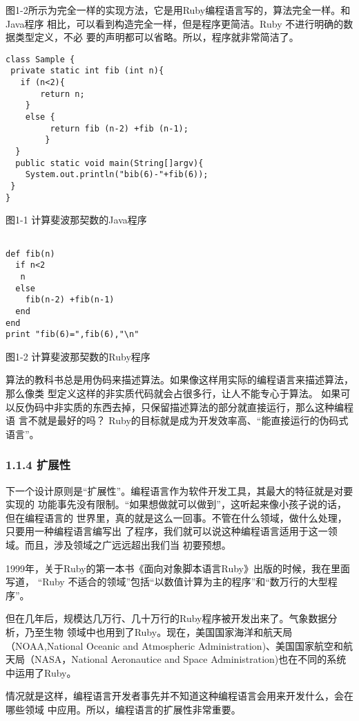 \documentclass[11pt]{ctexart}
\begin{document}
图1-2所示为完全一样的实现方法，它是用Ruby编程语言写的，算法完全一样。和Java程序
相比，可以看到构造完全一样，但是程序更简洁。Ruby 不进行明确的数据类型定义，不必
要的声明都可以省略。所以，程序就非常简洁了。
\lstset{language=org,label= ,caption= ,captionpos=b,numbers=none}
\begin{lstlisting}
class Sample {
 private static int fib (int n){
   if (n<2){
       return n;
    }
    else {
         return fib (n-2) +fib (n-1);
        }
  }
  public static void main(String[]argv){
    System.out.println("bib(6)-"+fib(6));
 }
}
\end{lstlisting}
图1-1 计算斐波那契数的Java程序
\lstset{language=org,label= ,caption= ,captionpos=b,numbers=none}
\begin{lstlisting}

def fib(n)
  if n<2
   n
  else
    fib(n-2) +fib(n-1)
  end
end
print "fib(6)=",fib(6),"\n"
\end{lstlisting}
图1-2 计算斐波那契数的Ruby程序

算法的教科书总是用伪码来描述算法。如果像这样用实际的编程语言来描述算法，那么像类
型定义这样的非实质代码就会占很多行，让人不能专心于算法。
如果可以反伪码中非实质的东西去掉，只保留描述算法的部分就直接运行，那么这种编程语
言不就是最好的吗？ Ruby的目标就是成为开发效率高、“能直接运行的伪码式语言”。

\subsubsection{1.1.4 扩展性}
\label{sec:org6733309}

下一个设计原则是“扩展性”。编程语言作为软件开发工具，其最大的特征就是对要实现的
功能事先没有限制。“如果想做就可以做到”，这听起来像小孩子说的话，但在编程语言的
世界里，真的就是这么一回事。不管在什么领域，做什么处理，只要用一种编程语言编写出
了程序，我们就可以说这种编程语言适用于这一领域。而且，涉及领域之广远远超出我们当
初要预想。

1999年，关于Ruby的第一本书《面向对象脚本语言Ruby》出版的时候，我在里面写道，
“Ruby 不适合的领域”包括“以数值计算为主的程序”和“数万行的大型程序”。

但在几年后，规模达几万行、几十万行的Ruby程序被开发出来了。气象数据分析，乃至生物
领域中也用到了Ruby。现在，美国国家海洋和航天局（NOAA,National Oceanic and
Atmospheric Administration)、美国国家航空和航天局（NASA，National Aeronautice
and Space Administration)也在不同的系统中运用了Ruby。

情况就是这样，编程语言开发者事先并不知道这种编程语言会用来开发什么，会在哪些领域
中应用。所以，编程语言的扩展性非常重要。
\end{document}
